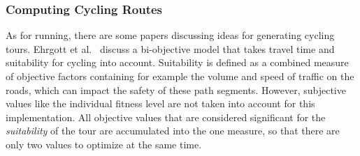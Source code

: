 %
%


\subsubsection{Computing Cycling Routes}
\label{subsubsec:cyclingRoutes}

As for running, there are some papers discussing ideas for generating cycling tours.
Ehrgott et al.\ \cite{ehrgott_bi-objective_2012}  discuss a bi-objective model that takes travel time and \glqq suitability for cycling\grqq{} into account.
Suitability is defined as a combined measure of objective factors containing for example the volume and speed of traffic on the roads, which can impact the safety of these path segments. 
However, subjective values like the individual fitness level are not taken into account for this implementation.
All objective values that are considered significant for the \textit{suitability} of the tour are accumulated into the one measure, so that there are only two values to optimize at the same time. 

